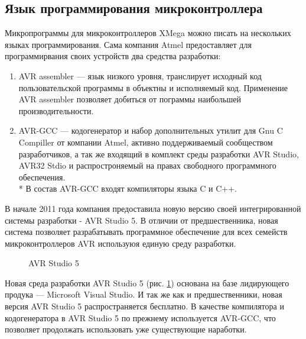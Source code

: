 \subsection{Язык программирования микроконтроллера}
\begin{par}
Микропрограммы для микроконтроллеров XMega можно писать на нескольких языках программирования.
Сама компания Atmel предоставляет для программирвания своих устройств два средства разработки:
	\begin{enumerate}
		\item{}AVR assembler --- язык низкого уровня, транслирует исходный код пользовательской
                программы в объектны и исполняемый код. Применение AVR assembler позволяет
                добиться от пограммы наибольшей производительности.
		\item{}AVR-GCC --- кодогенератор и набор дополнительных утилит для Gnu C Compiller от
                компании Atmel, активно поддерживаемый сообществом разработчиков, а так же
                входящий в комплект среды разработки AVR Studio, AVR32 Stdio и
                распростроняемый на правах свободного программного обеспечения.\\*
                В состав AVR-GCC входят компиляторы языка C и C++.
	\end{enumerate}
\end{par}

\begin{par}
В начале 2011 года компания предоставила новую версию своей интегрированной системы
разработки - AVR Studio 5. В отличии от предшественника, новая система позволяет разрабатывать
программное обеспечение для всех семейств микроконтроллеров AVR используюя единую среду разработки.
\end{par}

\begin{par}

\begin{figure}[h]
	\caption{AVR Studio 5}
	\label{img:avr_studio}
\end{figure}


Новая среда разработки AVR Studio 5 (рис. \ref{img:avr_studio}) основана на базе лидирующего продука --- Microsoft Visual Studio.
И так же как и предшественники, новая версия AVR Studio 5  распространяется бесплатно.
В качестве компилятора и кодогенератора в AVR Studio 5 по прежнему используется AVR-GCC,
что позволяет продолжать использовать уже существующие наработки.
\end{par}

